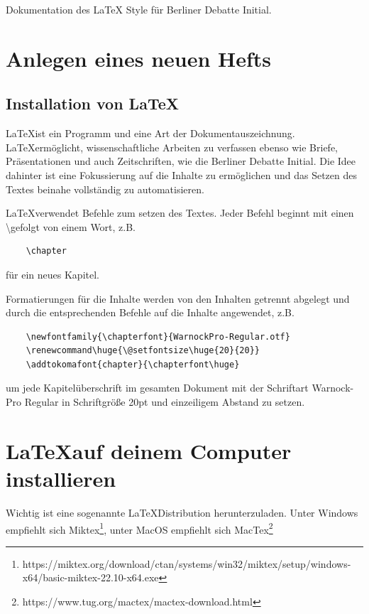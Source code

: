 \documentclass{article}
\begin{document}
 
Dokumentation des {\LaTeX} Style für Berliner Debatte Initial.

\section{Anlegen eines neuen Hefts}

\subsection{Installation von \LaTeX}

\LaTeX ist ein Programm und eine Art der Dokumentauszeichnung. \LaTeX ermöglicht, wissenschaftliche Arbeiten zu verfassen ebenso wie Briefe, Präsentationen und auch Zeitschriften, wie die Berliner Debatte Initial. Die Idee dahinter ist eine Fokussierung auf die Inhalte zu ermöglichen und das Setzen des Textes beinahe vollständig zu automatisieren.

\LaTeX verwendet Befehle zum setzen des Textes. Jeder Befehl beginnt mit einen \textbackslash gefolgt von einem Wort, z.B. 

\begin{lstlisting}
    \chapter
\end{lstlisting}

für ein neues Kapitel. 

Formatierungen für die Inhalte werden von den Inhalten getrennt abgelegt und durch die entsprechenden Befehle auf die Inhalte angewendet, z.B. 

\begin{lstlisting}
    \newfontfamily{\chapterfont}{WarnockPro-Regular.otf}
    \renewcommand\huge{\@setfontsize\huge{20}{20}}
    \addtokomafont{chapter}{\chapterfont\huge}
\end{lstlisting}

um jede Kapitelüberschrift im gesamten Dokument mit der Schriftart Warnock-Pro Regular in Schriftgröße 20pt und einzeiligem Abstand zu setzen. 


\section{\LaTeX auf deinem Computer installieren}

Wichtig ist eine sogenannte \LaTeX Distribution herunterzuladen. Unter Windows empfiehlt sich Miktex\footnote{https://miktex.org/download/ctan/systems/win32/miktex/setup/windows-x64/basic-miktex-22.10-x64.exe}, unter MacOS empfiehlt sich MacTex\footnote{https://www.tug.org/mactex/mactex-download.html}
\end{document}
